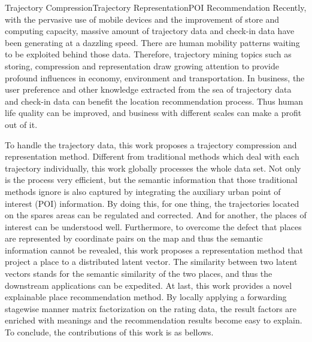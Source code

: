 
\begin{Eabstract}{Trajectory Compression}{Trajectory Representation}{POI Recommendation}{}{}
Recently, with the pervasive use of mobile devices and the improvement of store and computing capacity, massive amount of trajectory data and check-in data have been generating at a dazzling speed. There are human mobility patterns waiting to be exploited behind those data. Therefore, trajectory mining topics such as storing, compression and representation draw growing attention to provide profound influences in economy, environment and transportation. In business, the user preference and other knowledge extracted from the sea of trajectory data and check-in data can benefit the location recommendation process. Thus human life quality can be improved, and business with different scales can make a profit out of it.

To handle the trajectory data, this work proposes a trajectory compression and representation method. Different from traditional methods which deal with each trajectory individually, this work globally processes the whole data set. Not only is the process very efficient, but the semantic information that those traditional methods ignore is also captured by integrating the auxiliary urban point of interest (POI) information. By doing this, for one thing, the trajectories located on the spares areas can be regulated and corrected. And for another, the places of interest can be understood well. Furthermore, to overcome the defect that places are represented by coordinate pairs on the map and thus the semantic information cannot be revealed, this work proposes a representation method that project a place to a distributed latent vector. The similarity between two latent vectors stands for the semantic similarity of the two places, and thus the downstream applications can be expedited. At last, this work provides a novel explainable place recommendation method. By locally applying a forwarding stagewise manner matrix factorization on the rating data, the result factors are enriched with meanings and the recommendation results become easy to explain. To conclude, the contributions of this work is as bellows.


\end{Eabstract}
